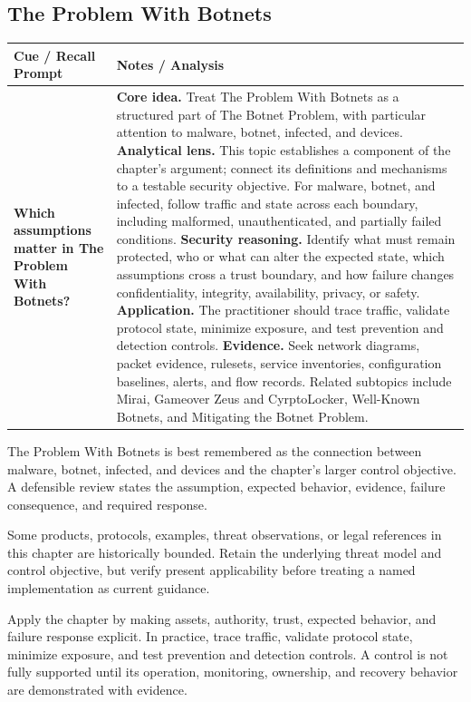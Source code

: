 \documentclass[11pt]{article}
\newcommand{\CornellHeader}{%
\rowcolor{Navy}\color{white}\bfseries Cue / Recall Prompt & \color{white}\bfseries Notes / Analysis\\\hline}
\newcommand{\CornellRow}[2]{%
\cellcolor{CueGray}\RaggedRight\textbf{#1} & \RaggedRight #2\\\hline}
\begin{document}
\subsection*{The Problem With Botnets}
\begin{longtable}{>{\RaggedRight\arraybackslash}p{}|>{\RaggedRight\arraybackslash}p{}}
\CornellHeader
\CornellRow{Which assumptions matter in The Problem With Botnets?}{\textbf{Core idea.} Treat The Problem With Botnets as a structured part of The Botnet Problem, with particular attention to malware, botnet, infected, and devices. \textbf{Analytical lens.} This topic establishes a component of the chapter's argument; connect its definitions and mechanisms to a testable security objective. For malware, botnet, and infected, follow traffic and state across each boundary, including malformed, unauthenticated, and partially failed conditions. \textbf{Security reasoning.} Identify what must remain protected, who or what can alter the expected state, which assumptions cross a trust boundary, and how failure changes confidentiality, integrity, availability, privacy, or safety. \textbf{Application.} The practitioner should trace traffic, validate protocol state, minimize exposure, and test prevention and detection controls. \textbf{Evidence.} Seek network diagrams, packet evidence, rulesets, service inventories, configuration baselines, alerts, and flow records. Related subtopics include Mirai, Gameover Zeus and CyrptoLocker, Well-Known Botnets, and Mitigating the Botnet Problem.}
\end{longtable}
\begin{topicsummary}
The Problem With Botnets is best remembered as the connection between malware, botnet, infected, and devices and the chapter's larger control objective. A defensible review states the assumption, expected behavior, evidence, failure consequence, and required response.
\end{topicsummary}
\begin{historybox}
Some products, protocols, examples, threat observations, or legal references in this chapter are historically bounded. Retain the underlying threat model and control objective, but verify present applicability before treating a named implementation as current guidance.
\end{historybox}
\begin{defensebox}
Apply the chapter by making assets, authority, trust, expected behavior, and failure response explicit. In practice, trace traffic, validate protocol state, minimize exposure, and test prevention and detection controls. A control is not fully supported until its operation, monitoring, ownership, and recovery behavior are demonstrated with evidence.
\end{defensebox}
\end{document}
